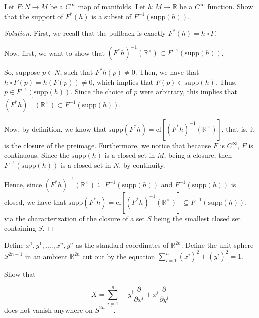 \documentclass[10pt]{article}
\newenvironment{problem}[2][]{\begin{trivlist}
\item[\hskip \labelsep {\bfseries #1}\hskip \labelsep {\bfseries #2.}]}{\end{trivlist}}
\begin{document}
\begin{problem}{Question 2}

Let $F:N \to M$ be a $C^\infty$ map of manifolds. Let $h: M \to \mathbb{R}$ be a $C^\infty$ function. Show that the support of $F^*(h)$ is a subset of $F^{-1}(\text{supp}(h))$.

\end{problem}

\begin{proof}[Solution]

First, we recall that the pullback is exactly $F^*(h) = h \circ F$.

Now, first, we want to show that $(F^*h)^{-1}(\mathbb{R}^\times) \subset F^{-1}(\text{supp}(h))$.

So, suppose $p \in N$, such that $F^*h(p) \not = 0$. Then, we have that $h \circ F(p) = h(F(p)) \not = 0$, which implies that $F(p) \in \text{supp}(h)$. Thus, $p \in F^{-1}(\text{supp}(h))$. Since the choice of $p$ were arbitrary, this implies that $(F^*h)^{-1}(\mathbb{R}^\times) \subset F^{-1}(\text{supp}(h))$.

Now, by definition, we know that $\text{supp}(F^*h) = \text{cl}[(F^*h)^{-1}(\mathbb{R}^\times)]$, that is, it is the closure of the preimage. Furthermore, we notice that because $F$ is $C^\infty$, $F$ is continuous. Since the $\text{supp}(h)$ is a closed set in $M$, being a closure, then $F^{-1}(\text{supp}(h))$ is a closed set in $N$, by continuity.

Hence, since $(F^*h)^{-1}(\mathbb{R}^\times) \subseteq F^{-1}(\text{supp}(h))$ and $F^{-1}(\text{supp}(h))$ is closed, we have that $\text{supp}(F^*h) = \text{cl}[(F^*h)^{-1}(\mathbb{R}^\times)] \subseteq F^{-1}(\text{supp}(h))$, via the characterization of the closure of a set $S$ being the smallest closed set containing $S$.

\end{proof}

\begin{problem}{Question 3}

Define $x^1, y^1,....,x^n, y^n$ as the standard coordinates of $\mathbb{R}^{2n}$. Define the unit sphere $S^{2n-1}$ in an ambient $\mathbb{R}^{2n}$ cut out by the equation $\sum_{i=1}^n (x^i)^2 + (y^i)^2 = 1$.

Show that 

$$ X= \sum_{i=1}^n -y^i \frac{\partial}{\partial x^i} + x^i \frac{\partial}{\partial y^i} $$ does not vanish anywhere on $S^{2n-1}$.

\end{problem}
\end{document}
